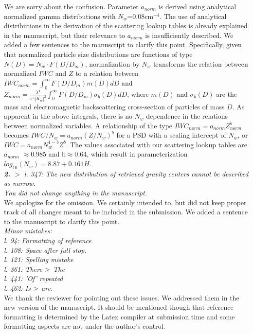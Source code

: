 \documentclass[12pt]{article}
\begin{document}
\noindent We are sorry about the confusion. Parameter $a_{norm}$ is derived using analytical normalized gamma distributions with $N_w$=0.08cm$^{-4}$. The use of analytical distributions in the derivation of the scattering lookup tables is already explained in the manuscript, but their relevance to $a_{norm}$ is insufficiently described. We added a few sentences to the manuscript to clarify this point.  Specifically, given that normalized particle size distributions are functions of type $N(D)=N_w\cdot F(D/D_m)$, normalization by $N_w$ transforms the relation between normalized $IWC$ and $Z$ to a relation between $IWC_{norm}=\int_0^{\infty} F(D/D_m)m(D)dD$ and $Z_{norm}=\frac {\lambda ^4} {\pi ^5 |K_w|^2} \int_0^{\infty} F(D/D_m) \sigma_b(D) dD$, where $m(D)$ and $\sigma_b(D)$ are the mass and electromagnetic backscattering cross-section of particles of mass $D$. As apparent in the above integrals, there is no $N_w$ dependence in the relations between normalized variables. A relationship of the type $IWC_{norm}=a_{norm}Z_{norm}^b$ becomes $IWC/N_w=a_{norm}(Z/N_w)^b$ for a PSD with a scaling intercept of $N_w$, or $IWC=a_{norm}N_w^{1-b}Z^b$. The values associated with our scattering lookup tables are $a_{norm}$ $\approx$0.985 and b$\approx$0.64, which result in parameterization $log_{10}(N_w)=8.87+0.161H$.\\


\noindent\textit{\textbf{2.}
$>$ l. 347: The new distribution of retrieved gravity centers cannot be described as narrow.\\
You did not change anything in the manuscript.}\\

\noindent We apologize for the omission. We certainly intended to, but did not keep proper track of all changes meant to be included in the submission. We added a sentence to the manuscript to clarify this point.\\

\noindent\textit{Minor mistakes:\\
l. 94: Formatting of reference\\
l. 108: Space after full stop.\\
l. 121: Spelling mistake\\
l. 361: There $\->$ The\\
l. 441: 'Of' repeated\\
l. 462: Is $\->$ are.} \\

\noindent We thank the reviewer for pointing out these issues. We addressed them in the new version of the manuscript. It should be mentioned though that reference formatting is determined by the Latex compiler at submission time and some formatting aspects are not under the author's control.\\
\end{document}
